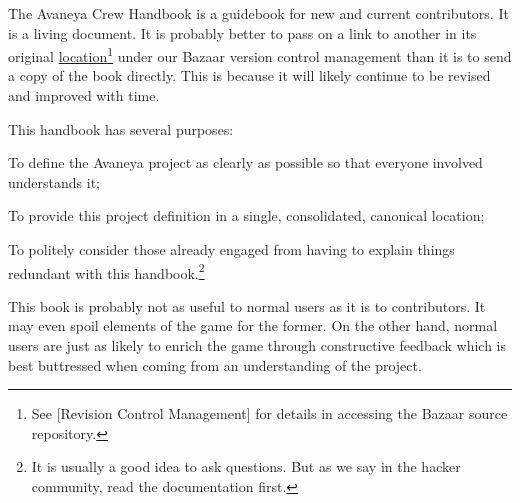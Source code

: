 

The Avaneya Crew Handbook is a guidebook for new and current contributors. It is a living document. It is probably better to pass on a link to another in its original \href{http://bazaar.launchpad.net/~avaneya/avaneya/trunk/view/head:/Documentation/Contributors/Handbook/Avaneya\%20Crew\%20Handbook.pdf}{location}\footnote[]{See [Revision Control Management] for details in accessing the Bazaar source repository.} under our Bazaar version control management than it is to send a copy of the book directly. This is because it will likely continue to be revised and improved with time.

This handbook has several purposes:

\startitemize[R]
\item
To define the Avaneya project as clearly as possible so that everyone involved understands it;

\item
To provide this project definition in a single, consolidated, canonical location;

\item
To politely consider those already engaged from having to explain things redundant with this handbook.\footnote[rtfm]{It is usually a good idea to ask questions. But as we say in the hacker community, read the documentation first.}
\stopitemize

This book is probably not as useful to normal users as it is to contributors. It may even spoil elements of the game for the former. On the other hand, normal users are just as likely to enrich the game through constructive feedback which is best buttressed when coming from an understanding of the project.

\StopChapter

